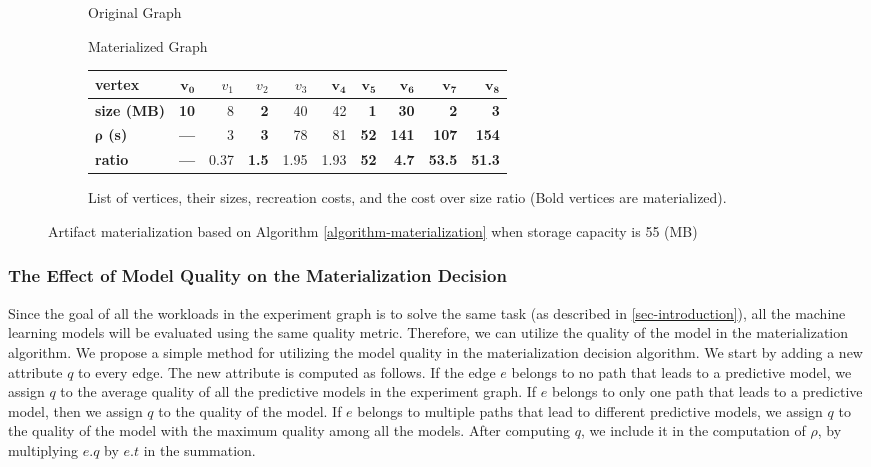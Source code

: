 \begin{figure}
\begin{subfigure}{0.5\linewidth}
\centering

\caption{Original Graph}
\label{fig-materialization-example}
\end{subfigure}%
\begin{subfigure}{0.5\linewidth}
\centering

\caption{Materialized Graph}
\label{fig-materialization-example}
\end{subfigure}
\begin{subfigure}{\linewidth}
\setlength\tabcolsep{3.5pt} %
\begin{tabular}{l | | >{\bfseries}r | r  |>{\bfseries}r | r | r | >{\bfseries}r | >{\bfseries}r | >{\bfseries}r |>{\bfseries}r }
\hline
\textbf{vertex} & $\boldsymbol{v_0}$ & $v_1$ & $v_2$ & $v_3$ & $\boldsymbol{v_4}$ & $\boldsymbol{v_5}$ & $\boldsymbol{v_6}$ & $\boldsymbol{v_7}$ &$\boldsymbol{v_8}$ \\
\hline
\textbf{size (MB)}    & 10 & 8 & 2 & 40 & 42 & 1 & 30 & 2   & 3        \\
\textbf{$\boldsymbol{\rho}$ (s)} & ---   & 3 & 3 & 78 & 81 & 52 & 141 & 107 & 154	  \\
\textbf{ratio}& ---   & 0.37 & 1.5 & 1.95 & 1.93 & 52 & 4.7 & 53.5 & 51.3	\\
\hline
\end{tabular}
\caption{List of vertices, their sizes, recreation costs, and the cost over size ratio (Bold vertices are materialized).}
\end{subfigure}
\caption{Artifact materialization based on Algorithm \ref{algorithm-materialization} when storage capacity is 55 (MB)}
\end{figure}

\subsubsection{The Effect of Model Quality on the Materialization Decision}
Since the goal of all the workloads in the experiment graph is to solve the same task (as described in \ref{sec-introduction}), all the machine learning models will be evaluated using the same quality metric.
Therefore, we can utilize the quality of the model in the materialization algorithm.
We propose a simple method for utilizing the model quality in the materialization decision algorithm.
We start by adding a new attribute $q$ to every edge.
The new attribute is computed as follows.
If the edge $e$ belongs to no path that leads to a predictive model, we assign $q$ to the average quality of all the predictive models in the experiment graph.
If $e$ belongs to only one path that leads to a predictive model, then we assign $q$ to the quality of the model.
If $e$ belongs to multiple paths that lead to different predictive models, we assign $q$ to the quality of the model with the maximum quality among all the models.
After computing $q$, we include it in the computation of $\rho$, by multiplying $e.q$ by $e.t$ in the summation. 

